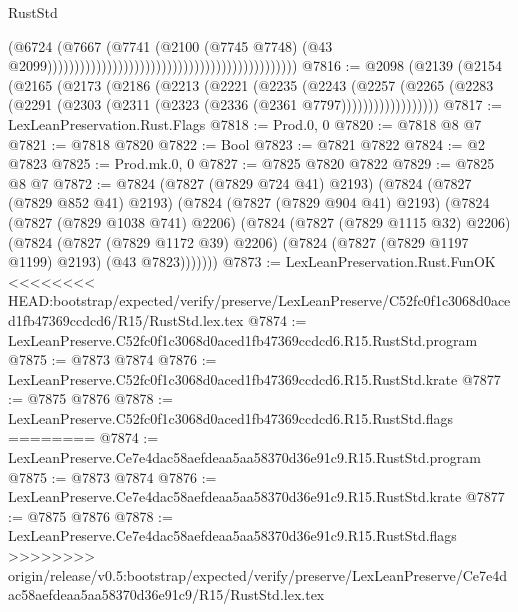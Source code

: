 \begin{lexlean}{RustStd}
\begin{coremodule}
{\begin{coremodule}
{{{{{{{{{{{{{{{{{{{{{{{{{{{{{{{{{{{{{{{{{{{{{{{{{{                                                                                      (@6724
                                                                                        (@7667
                                                                                          (@7741
                                                                                            (@2100
                                                                                              (@7745
                                                                                                @7748)
                                                                                              (@43
                                                                                                @2099))))))))))))))))))))))))))))))))))))))))))))))
@7816 := @2098
    (@2139
      (@2154
        (@2165
          (@2173
            (@2186
              (@2213
                (@2221
                  (@2235
                    (@2243
                      (@2257
                        (@2265
                          (@2283 (@2291 (@2303 (@2311 (@2323 (@2336 (@2361 @7797))))))))))))))))))
@7817 := LexLeanPreservation.Rust.Flags
@7818 := Prod.{0, 0}
@7820 := @7818 @8 @7
@7821 := @7818 @7820
@7822 := Bool
@7823 := @7821 @7822
@7824 := @2 @7823
@7825 := Prod.mk.{0, 0}
@7827 := @7825 @7820 @7822
@7829 := @7825 @8 @7
@7872 := @7824
    (@7827 (@7829 @724 @41) @2193)
    (@7824
      (@7827 (@7829 @852 @41) @2193)
      (@7824
        (@7827 (@7829 @904 @41) @2193)
        (@7824
          (@7827 (@7829 @1038 @741) @2206)
          (@7824
            (@7827 (@7829 @1115 @32) @2206)
            (@7824
              (@7827 (@7829 @1172 @39) @2206)
              (@7824 (@7827 (@7829 @1197 @1199) @2193) (@43 @7823)))))))
@7873 := LexLeanPreservation.Rust.FunOK
<<<<<<<< HEAD:bootstrap/expected/verify/preserve/LexLeanPreserve/C52fc0f1c3068d0aced1fb47369ccdcd6/R15/RustStd.lex.tex
@7874 := LexLeanPreserve.C52fc0f1c3068d0aced1fb47369ccdcd6.R15.RustStd.program
@7875 := @7873 @7874
@7876 := LexLeanPreserve.C52fc0f1c3068d0aced1fb47369ccdcd6.R15.RustStd.krate
@7877 := @7875 @7876
@7878 := LexLeanPreserve.C52fc0f1c3068d0aced1fb47369ccdcd6.R15.RustStd.flags
========
@7874 := LexLeanPreserve.Ce7e4dac58aefdeaa5aa58370d36e91c9.R15.RustStd.program
@7875 := @7873 @7874
@7876 := LexLeanPreserve.Ce7e4dac58aefdeaa5aa58370d36e91c9.R15.RustStd.krate
@7877 := @7875 @7876
@7878 := LexLeanPreserve.Ce7e4dac58aefdeaa5aa58370d36e91c9.R15.RustStd.flags
>>>>>>>> origin/release/v0.5:bootstrap/expected/verify/preserve/LexLeanPreserve/Ce7e4dac58aefdeaa5aa58370d36e91c9/R15/RustStd.lex.tex
}}}}}}}}}}}}}}}}}}}}}}}}}}}}}}}}}}}}}}}}}}}}}}}}}}
\end{coremodule}}
\end{coremodule}
\end{lexlean}
